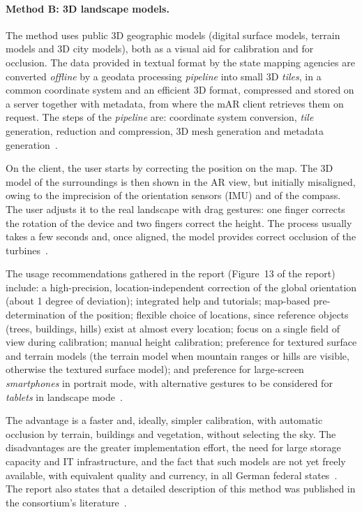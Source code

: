 \paragraph{Method B: 3D landscape models.}
\label{sec:ar4wind_metodoB}
The method uses public 3D geographic models (digital surface models, terrain models and 3D city models), both as a visual aid for calibration and for occlusion. The data provided in textual format by the state mapping agencies are converted \textit{offline} by a geodata processing \textit{pipeline} into small 3D \textit{tiles}, in a common coordinate system and an efficient 3D format, compressed and stored on a server together with metadata, from where the mAR client retrieves them on request. The steps of the \textit{pipeline} are: coordinate system conversion, \textit{tile} generation, reduction and compression, 3D mesh generation and metadata generation~\cite[Sec.~2.2.2.3, Fig.~11]{ar4wind2023}.

On the client, the user starts by correcting the position on the map. The 3D model of the surroundings is then shown in the AR view, but initially misaligned, owing to the imprecision of the orientation sensors (IMU) and of the compass. The user adjusts it to the real landscape with drag gestures: one finger corrects the rotation of the device and two fingers correct the height. The process usually takes a few seconds and, once aligned, the model provides correct occlusion of the turbines~\cite[Sec.~2.2.2.3, Fig.~12]{ar4wind2023}.

The usage recommendations gathered in the report (Figure~13 of the report) include: a high-precision, location-independent correction of the global orientation (about 1 degree of deviation); integrated help and tutorials; map-based pre-determination of the position; flexible choice of locations, since reference objects (trees, buildings, hills) exist at almost every location; focus on a single field of view during calibration; manual height calibration; preference for textured surface and terrain models (the terrain model when mountain ranges or hills are visible, otherwise the textured surface model); and preference for large-screen \textit{smartphones} in portrait mode, with alternative gestures to be considered for \textit{tablets} in landscape mode~\cite[Fig.~13]{ar4wind2023}.

The advantage is a faster and, ideally, simpler calibration, with automatic occlusion by terrain, buildings and vegetation, without selecting the sky. The disadvantages are the greater implementation effort, the need for large storage capacity and IT infrastructure, and the fact that such models are not yet freely available, with equivalent quality and currency, in all German federal states~\cite[Sec.~2.2.2.3]{ar4wind2023}. The report also states that a detailed description of this method was published in the consortium's literature~\cite{burkard2022gistam,burkard2022icict,burkard2022eis}.

